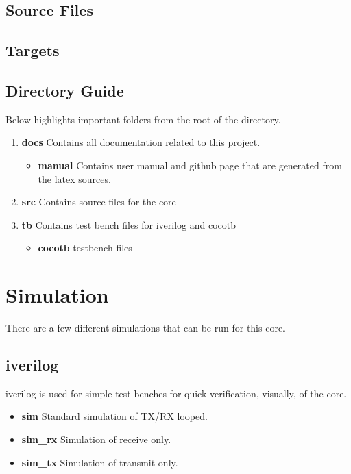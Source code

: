 \subsection{Source Files}



\subsection{Targets}



\subsection{Directory Guide}

\par
Below highlights important folders from the root of the directory.

\begin{enumerate}
  \item \textbf{docs} Contains all documentation related to this project.
    \begin{itemize}
      \item \textbf{manual} Contains user manual and github page that are generated from the latex sources.
    \end{itemize}
  \item \textbf{src} Contains source files for the core
  \item \textbf{tb} Contains test bench files for iverilog and cocotb
    \begin{itemize}
      \item \textbf{cocotb} testbench files
    \end{itemize}
\end{enumerate}

\newpage

\section{Simulation}
\par
There are a few different simulations that can be run for this core.

\subsection{iverilog}
\par
iverilog is used for simple test benches for quick verification, visually, of the core.
\begin{itemize}
  \item \textbf{sim} Standard simulation of TX/RX looped.
  \item \textbf{sim\_rx} Simulation of receive only.
  \item \textbf{sim\_tx} Simulation of transmit only.
\end{itemize}

